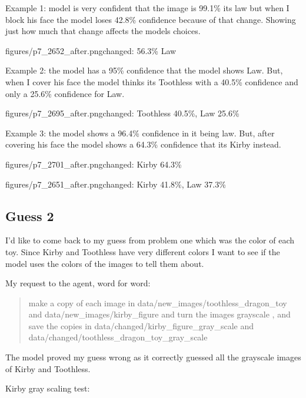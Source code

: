 \documentclass[11pt]{article}
\begin{document}
Example 1: model is very confident that the image is 99.1\% its law but when I block his face the model loses 42.8\% confidence because
of that change. Showing just how much that change affects the models choices.

           {figures/p7_2652_after.png}{changed: 56.3\% Law}

Example 2: the model has a 95\% confidence that the model shows Law. But, when
I cover his face the model thinks its Toothless with a 40.5\% confidence and
only a 25.6\% confidence for Law.

           {figures/p7_2695_after.png}{changed: Toothless 40.5\%, Law 25.6\%}

Example 3: the model shows a 96.4\% confidence in it being law. But, after
covering his face the model shows a 64.3\% confidence that its Kirby instead.

           {figures/p7_2701_after.png}{changed: Kirby 64.3\%}

           {figures/p7_2651_after.png}{changed: Kirby 41.8\%, Law 37.3\%}

\subsection*{Guess 2}

I'd like to come back to my guess from problem one which was the color of each
toy. Since Kirby and Toothless have very different colors I want to see if the
model uses the colors of the images to tell them about.

My request to the agent, word for word:
\begin{quote}
make a copy of each image in data/new\_images/toothless\_dragon\_toy and
data/new\_images/kirby\_figure and turn the images grayscale , and save the
copies in data/changed/kirby\_figure\_gray\_scale and
data/changed/toothless\_dragon\_toy\_gray\_scale
\end{quote}

The model proved my guess wrong as it correctly guessed all the grayscale
images of Kirby and Toothless.

Kirby gray scaling test:
\end{document}
